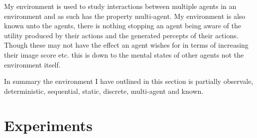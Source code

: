 \documentclass[]{final_report}
\begin{document}
My environment is used to study interactions between multiple agents in an environment and as such has the property multi-agent. My environment is also known unto the agents, there is nothing stopping an agent being aware of the utility produced by their actions and the generated percepts of their actions. Though these may not have the effect an agent wishes for in terms of increasing their image score etc. this is down to the mental states of other agents not the environment itself.\par 
In summary the environment I have outlined in this section is partially observale, deterministic, sequential, static, discrete, multi-agent and known.

\section{Experiments}
\end{document}
